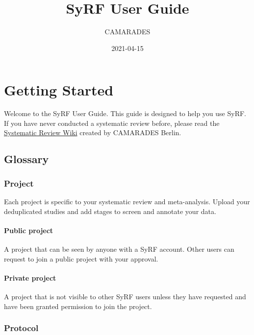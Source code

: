 \documentclass[
]{book}
\title{SyRF User Guide}
\author{CAMARADES}
\date{2021-04-15}
\begin{document}
\maketitle

{
\setcounter{tocdepth}{1}
\tableofcontents
}
\hypertarget{index}{%
\chapter{Getting Started}\label{index}}

Welcome to the SyRF User Guide. This guide is designed to help you use SyRF. If you have never conducted a systematic review before, please read the \href{https://www.camarades.de/}{Systematic Review Wiki} created by CAMARADES Berlin.

\hypertarget{glossary}{%
\section{Glossary}\label{glossary}}

\hypertarget{project}{%
\subsection{Project}\label{project}}

Each project is specific to your systematic review and meta-analysis. Upload your deduplicated studies and add stages to screen and annotate your data.

\hypertarget{public-project}{%
\subsubsection{Public project}\label{public-project}}

A project that can be seen by anyone with a SyRF account. Other users can request to join a public project with your approval.

\hypertarget{private-project}{%
\subsubsection{Private project}\label{private-project}}

A project that is not visible to other SyRF users unless they have requested and have been granted permission to join the project.

\hypertarget{protocol}{%
\subsection{Protocol}\label{protocol}}
\end{document}
